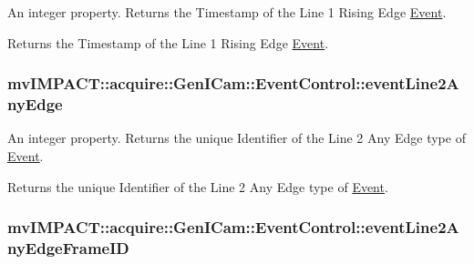 An integer property. Returns the Timestamp of the Line 1 Rising Edge \hyperlink{classmv_i_m_p_a_c_t_1_1acquire_1_1_event}{Event}. 

Returns the Timestamp of the Line 1 Rising Edge \hyperlink{classmv_i_m_p_a_c_t_1_1acquire_1_1_event}{Event}. \hypertarget{classmv_i_m_p_a_c_t_1_1acquire_1_1_gen_i_cam_1_1_event_control_ac9af1d51d92d43cba36bac2ffc65e8c3}{
\subsubsection[{event\+Line2\+Any\+Edge}]{ mv\+I\+M\+P\+A\+C\+T\+::acquire\+::\+Gen\+I\+Cam\+::\+Event\+Control\+::event\+Line2\+Any\+Edge}}\label{classmv_i_m_p_a_c_t_1_1acquire_1_1_gen_i_cam_1_1_event_control_ac9af1d51d92d43cba36bac2ffc65e8c3}


An integer property. Returns the unique Identifier of the Line 2 Any Edge type of \hyperlink{classmv_i_m_p_a_c_t_1_1acquire_1_1_event}{Event}. 

Returns the unique Identifier of the Line 2 Any Edge type of \hyperlink{classmv_i_m_p_a_c_t_1_1acquire_1_1_event}{Event}. \hypertarget{classmv_i_m_p_a_c_t_1_1acquire_1_1_gen_i_cam_1_1_event_control_a6276c068496d78d86f124b560b01963e}{
\subsubsection[{event\+Line2\+Any\+Edge\+Frame\+I\+D}]{ mv\+I\+M\+P\+A\+C\+T\+::acquire\+::\+Gen\+I\+Cam\+::\+Event\+Control\+::event\+Line2\+Any\+Edge\+Frame\+I\+D}}\label{classmv_i_m_p_a_c_t_1_1acquire_1_1_gen_i_cam_1_1_event_control_a6276c068496d78d86f124b560b01963e}


